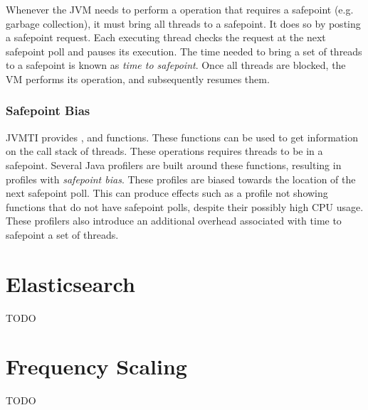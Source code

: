 Whenever the JVM needs to perform a operation that requires a safepoint (e.g. garbage collection), it must bring all threads to a safepoint. It does so by posting a safepoint request. Each executing thread checks the request at the next safepoint poll and pauses its execution. The time needed to bring a set of threads to a safepoint is known as \emph{time to safepoint}. Once all threads are blocked, the VM performs its operation, and subsequently resumes them.

\subsubsection*{Safepoint Bias}

JVMTI provides ,  and  functions. These functions can be used to get information on the call stack of threads. These operations requires threads to be in a safepoint. Several Java profilers are built around these functions, resulting in profiles with \emph{safepoint bias}. These profiles are biased towards the location of the next safepoint poll. This can produce effects such as a profile not showing functions that do not have safepoint polls, despite their possibly high CPU usage. These profilers also introduce an additional overhead associated with time to safepoint a set of threads.


\section{Elasticsearch}

TODO

\section{Frequency Scaling}

TODO







